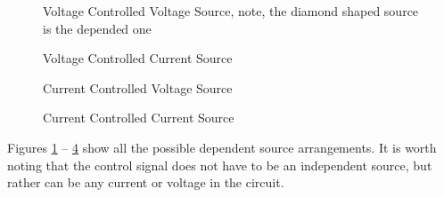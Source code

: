 \documentclass{handout}
\begin{document}
\newpage
\clearpage
\pagebreak

\begin{figure} [h! t! b!]
\centering
{}
\caption{Voltage Controlled Voltage Source, note, the diamond shaped source is
the depended one}
\label{fig: VCVS}
\end{figure}

\begin{figure} [h! t! b!]
\centering
{}
\caption{Voltage Controlled Current Source}
\label{fig: VCCS}
\end{figure}

\begin{figure} [h! t! b!]
\centering
{}
\caption{Current Controlled Voltage Source}
\label{fig: CCVS}
\end{figure}

\begin{figure} [h! t! b!]
\centering
{}
\caption{Current Controlled Current Source}
\label{fig: CCCS}
\end{figure}

Figures \ref{fig: VCVS} -- \ref{fig: CCCS} show all the possible dependent
source arrangements. It is worth noting that the control signal does not have
to be an independent source, but rather can be any current or voltage in the
circuit.
\end{document}
